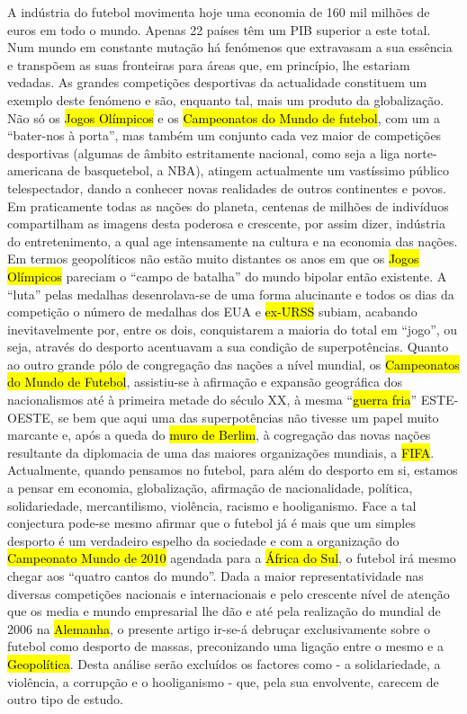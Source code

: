 \documentclass[a4paper,12pt]{article}
\begin{document}
A indústria do futebol movimenta hoje uma economia de 160 mil milhões de euros em todo o mundo. Apenas 22 países têm um PIB superior a este total.
 Num mundo em constante mutação há fenómenos que extravasam a sua essência e transpõem as suas fronteiras para áreas que, em princípio, lhe estariam vedadas. As grandes competições desportivas da actualidade constituem um exemplo deste fenómeno e são, enquanto tal, mais um produto da globalização. Não só os \hl{Jogos Olímpicos} e os \hl{Campeonatos do Mundo de futebol}, com um a “bater-nos à porta”, mas também um conjunto cada vez maior de competições desportivas (algumas de âmbito estritamente nacional, como seja a liga norte-americana de basquetebol, a NBA), atingem actualmente um vastíssimo público telespectador, dando a conhecer novas realidades de outros continentes e povos. Em praticamente todas as nações do planeta, centenas de milhões de indivíduos compartilham as imagens desta poderosa e crescente, por assim dizer, indústria do entretenimento, a qual age intensamente na cultura e na economia das nações.
 Em termos geopolíticos não estão muito distantes os anos em que os \hl{Jogos Olímpicos} pareciam o “campo de batalha” do mundo bipolar então existente. A “luta” pelas medalhas desenrolava-se de uma forma alucinante e todos os dias da competição o número de medalhas dos EUA e \hl{ex-URSS} subiam, acabando inevitavelmente por, entre os dois, conquistarem a maioria do total em “jogo”, ou seja, através do desporto acentuavam a sua condição de superpotências.
 Quanto ao outro grande pólo de congregação das nações a nível mundial, os \hl{Campeonatos do Mundo de Futebol}, assistiu-se à afirmação e expansão geográfica dos nacionalismos até à primeira metade do século XX, à mesma “\hl{guerra fria}” ESTE-OESTE,
 se bem que aqui uma das superpotências não tivesse um papel muito marcante e, após a queda do \hl{muro de Berlim}, à cogregação das novas nações resultante da diplomacia de uma das maiores organizações mundiais, a \hl{FIFA}.
Actualmente, quando pensamos no futebol, para além do desporto em si, estamos a pensar em economia, globalização, afirmação de nacionalidade, política, solidariedade, mercantilismo, violência, racismo e hooliganismo. Face a tal conjectura pode-se mesmo afirmar que o futebol já é mais que um simples desporto é um verdadeiro espelho da sociedade e com a organização do \hl{Campeonato Mundo de 2010} agendada para a \hl{África do Sul}, o futebol irá mesmo chegar aos “quatro cantos do mundo”.
 Dada a maior representatividade nas diversas competições nacionais e internacionais e pelo crescente nível de atenção que os media e mundo empresarial lhe dão e até pela realização do mundial de 2006 na \hl{Alemanha}, o presente artigo ir-se-á debruçar exclusivamente sobre o futebol como desporto de massas, preconizando uma ligação entre o mesmo e a \hl{Geopolítica}. Desta análise serão excluídos os factores como - a solidariedade, a violência, a corrupção e o hooliganismo - que, pela sua envolvente, carecem de outro tipo de estudo.
\end{document}
